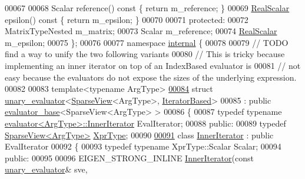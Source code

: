 \begin{DoxyCode}
00067   
00068   Scalar reference()\textcolor{keyword}{ const }\{ \textcolor{keywordflow}{return} m\_reference; \}
00069   \hyperlink{group___sparse_core___module_aaec8ace6efb785c81d442931c3248d88}{RealScalar} epsilon()\textcolor{keyword}{ const }\{ \textcolor{keywordflow}{return} m\_epsilon; \}
00070   
00071 \textcolor{keyword}{protected}:
00072   MatrixTypeNested m\_matrix;
00073   Scalar m\_reference;
00074   \hyperlink{group___sparse_core___module_aaec8ace6efb785c81d442931c3248d88}{RealScalar} m\_epsilon;
00075 \};
00076 
00077 \textcolor{keyword}{namespace }\hyperlink{namespaceinternal}{internal} \{
00078 
00079 \textcolor{comment}{// TODO find a way to unify the two following variants}
00080 \textcolor{comment}{// This is tricky because implementing an inner iterator on top of an IndexBased evaluator is}
00081 \textcolor{comment}{// not easy because the evaluators do not expose the sizes of the underlying expression.}
00082   
00083 \textcolor{keyword}{template}<\textcolor{keyword}{typename} ArgType>
\hyperlink{struct_eigen_1_1internal_1_1unary__evaluator_3_01_sparse_view_3_01_arg_type_01_4_00_01_iterator_based_01_4}{00084} \textcolor{keyword}{struct }\hyperlink{struct_eigen_1_1internal_1_1unary__evaluator}{unary\_evaluator}<\hyperlink{group___sparse_core___module_class_eigen_1_1_sparse_view}{SparseView}<ArgType>, 
      \hyperlink{struct_eigen_1_1internal_1_1_iterator_based}{IteratorBased}>
00085   : \textcolor{keyword}{public} \hyperlink{struct_eigen_1_1internal_1_1evaluator__base}{evaluator\_base}<SparseView<ArgType> >
00086 \{
00087     \textcolor{keyword}{typedef} \textcolor{keyword}{typename} \hyperlink{struct_eigen_1_1internal_1_1evaluator}{evaluator<ArgType>::InnerIterator} EvalIterator;
00088   \textcolor{keyword}{public}:
00089     \textcolor{keyword}{typedef} \hyperlink{group___sparse_core___module_class_eigen_1_1_sparse_view}{SparseView<ArgType>} \hyperlink{group___sparse_core___module_class_eigen_1_1_sparse_view}{XprType};
00090     
\hyperlink{class_eigen_1_1internal_1_1unary__evaluator_3_01_sparse_view_3_01_arg_type_01_4_00_01_iterator_based_01_4_1_1_inner_iterator}{00091}     \textcolor{keyword}{class }\hyperlink{class_eigen_1_1_inner_iterator}{InnerIterator} : \textcolor{keyword}{public} EvalIterator
00092     \{
00093         \textcolor{keyword}{typedef} \textcolor{keyword}{typename} XprType::Scalar Scalar;
00094       \textcolor{keyword}{public}:
00095 
00096         EIGEN\_STRONG\_INLINE \hyperlink{class_eigen_1_1_inner_iterator}{InnerIterator}(\textcolor{keyword}{const} \hyperlink{struct_eigen_1_1internal_1_1unary__evaluator}{unary\_evaluator}& sve, 

\end{DoxyCode}
